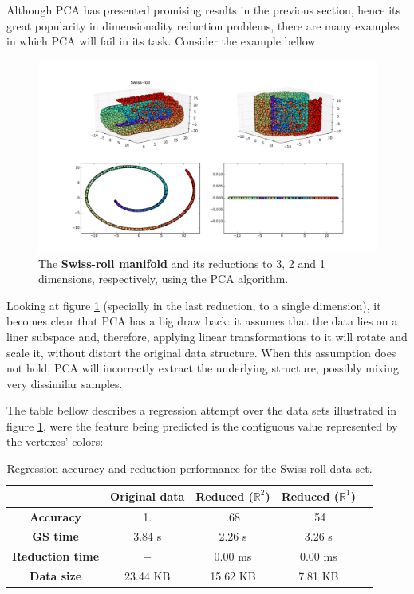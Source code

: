 \documentclass[12pt]{article}
\begin{document}
Although PCA has presented promising results in the previous section, hence its great popularity in dimensionality reduction problems, there are many examples in which PCA will fail in its task. Consider the example bellow:

\begin{figure}[H]
	\centering
	\captionsetup{justification=centering}

	\includegraphics[width=\linewidth]{swiss_pca}
	\caption{The \textbf{Swiss-roll manifold} and its reductions to 3, 2 and 1 dimensions, respectively, using the PCA algorithm.}
	\label{fig:swiss_pca}
\end{figure}

Looking at figure \ref{fig:swiss_pca} (specially in the last reduction, to a single dimension), it becomes clear that PCA has a big draw back: it assumes that the data lies on a liner subspace \cite{cay2005} and, therefore, applying linear transformations to it will rotate and scale it, without distort the original data structure. When this assumption does not hold, PCA will incorrectly extract the underlying structure, possibly mixing very dissimilar samples.

The table bellow describes a regression attempt over the data sets illustrated in figure \ref{fig:swiss_pca}, were the feature being predicted is the contiguous value represented by the vertexes' colors:

\begin{table}[H]
	\centering
	\begin{tabular}{|c|c|c|c|c|}
		\hline
		& \textbf{Original data} & \textbf{Reduced ($\mathbb{R}^2$)} & \textbf{Reduced ($\mathbb{R}^1$)} \\\hline
		\textbf{Accuracy} & 1. & .68 & .54 \\\hline
		\textbf{GS time}  & 3.84 s & 2.26 s & 3.26 s \\\hline
		\textbf{Reduction time} & $-$ & 0.00 ms & 0.00 ms \\\hline
		\textbf{Data size} & 23.44 KB & 15.62 KB  & 7.81 KB \\\hline
	\end{tabular}

	\captionsetup{justification=centering}
	\caption{Regression accuracy and reduction performance for the Swiss-roll data set.}
\end{table}
\end{document}
